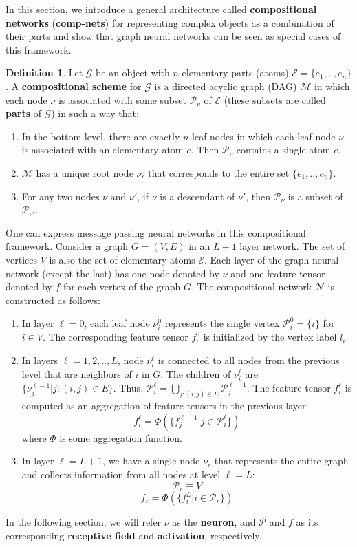 \documentclass[sigchi]{acmart}
\theoremstyle{definition}
\newtheorem{definition}{Definition}[section]
\theoremstyle{theorem}
\theoremstyle{corollary}
\theoremstyle{lemma}
\theoremstyle{remark}
\theoremstyle{prop}
\begin{document}
In this section, we introduce a general architecture called \textbf{compositional networks} (\textbf{comp-nets}) for representing complex objects as a combination of their parts and show that graph neural networks can be seen as special cases of this framework.
\begin{definition}
Let $\mathcal{G}$ be an object with $n$ elementary parts (atoms) $\mathcal{E} = \{e_1, .., e_n\}$. A \textbf{compositional scheme} for $\mathcal{G}$ is a directed acyclic graph (DAG) $\mathcal{M}$ in which each node $\nu$ is associated with some subset $\mathcal{P}_{\nu}$ of $\mathcal{E}$ (these subsets are called \textbf{parts} of $\mathcal{G}$) in such a way that:
\begin{enumerate}
\item In the bottom level, there are exactly $n$ leaf nodes in which each leaf node $\nu$ is associated with an elementary atom $e$. Then $\mathcal{P}_\nu$ contains a single atom $e$.
\item $\mathcal{M}$ has a unique root node $\nu_r$ that corresponds to the entire set $\{e_1, .., e_n\}$.
\item For any two nodes $\nu$ and $\nu'$, if $\nu$ is a descendant of $\nu'$, then $\mathcal{P}_\nu$ is a subset of $\mathcal{P}_{\nu'}$. 
\end{enumerate}
\end{definition}
One can express message passing neural networks in this compositional framework. Consider a graph $G = (V, E)$ in an $L + 1$ layer network. The set of vertices $V$ is also the set of elementary atoms $\mathcal{E}$. Each layer of the graph neural network (except the last) has one node denoted by $\nu$ and one feature tensor denoted by $f$ for each vertex of the graph $G$. The compositional network $\mathcal{N}$ is constructed as follows:
\begin{enumerate}
\item In layer $\ell = 0$, each leaf node $\nu_i^0$ represents the single vertex $\mathcal{P}_i^0 = \{i\}$ for $i \in V$. The corresponding feature tensor $f_i^0$ is initialized by the vertex label $l_i$.
\item In layers $\ell = 1, 2, .., L$, node $\nu_i^\ell$ is connected to all nodes from the previous level that are neighbors of $i$ in $G$. The children of $\nu_i^\ell$ are $\{\nu_j^{\ell - 1}|j:(i, j) \in E\}$. Thus, $\mathcal{P}_i^\ell = \bigcup_{j:(i, j) \in E} \mathcal{P}_j^{\ell - 1}$. The feature tensor $f_i^\ell$ is computed as an aggregation of feature tensors in the previous layer:
$$f_i^\ell = \Phi(\{f_j^{\ell - 1}|j \in \mathcal{P}_i^\ell\})$$
where $\Phi$ is some aggregation function.
\item In layer $\ell = L + 1$, we have a single node $\nu_r$ that represents the entire graph and collects information from all nodes at level $\ell = L$:
$$\mathcal{P}_r \equiv V$$
$$f_r = \Phi(\{f_i^L|i \in \mathcal{P}_r\})$$
\end{enumerate}
In the following section, we will refer $\nu$ as the \textbf{neuron}, and $\mathcal{P}$ and $f$ as its corresponding \textbf{receptive field} and \textbf{activation}, respectively. 
\end{document}

